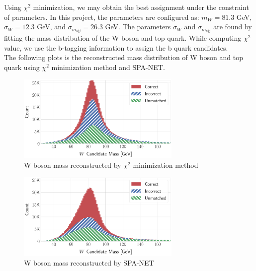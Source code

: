 Using $\chi^{2}$ minimization, we may obtain the best assignment under the constraint of parameters. In this project, the parameters are configured as: $m_{W}=81.3$ GeV, $\sigma_{W} = 12.3$ GeV, and $\sigma_{m_{bjj}}=26.3$ GeV. The parameters $\sigma_{W}$ and $\sigma_{m_{bjj}}$ are found by fitting the mass distribution of the W boson and top quark. While computing $\chi^{2}$ value, we use the b-tagging information to assign the b quark candidates. 
\\
The following plots is the reconstructed mass distribution of W boson and top quark using $\chi^{2}$ minimization method and SPA-NET.
\\
\begin{figure}[H]
	\centering
	\includegraphics[width=0.7\textwidth]{Figures/network_w_quark_stacked_chi2.pdf}
	\caption{W boson mass reconstructed by $\chi^{2}$ minimization method}
	\label{fig: chi2 reco Wboson}
\end{figure}
\begin{figure}[H]
	\centering
	\includegraphics[width=0.7\textwidth]{Figures/network_w_quark_stacked.pdf}
	\caption{W boson mass reconstructed by SPA-NET}
	\label{fig: spanet reco Wboson}
\end{figure}


